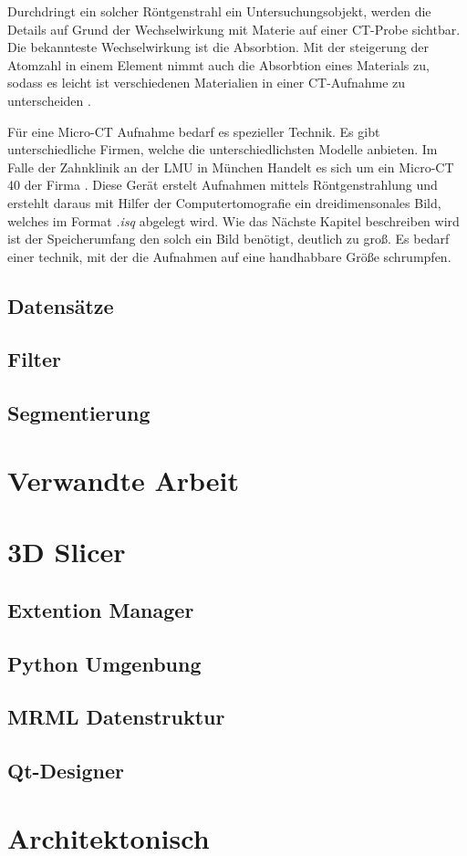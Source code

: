 Durchdringt ein solcher Röntgenstrahl ein Untersuchungsobjekt, werden die Details
auf Grund der Wechselwirkung mit Materie auf einer CT-Probe sichtbar. Die
bekannteste Wechselwirkung ist die Absorbtion. Mit der steigerung der Atomzahl in
einem Element nimmt auch die Absorbtion eines Materials zu, sodass es leicht ist
verschiedenen Materialien in einer CT-Aufnahme zu unterscheiden \citep{nib2024}.

Für eine Micro-CT Aufnahme bedarf es spezieller Technik. Es gibt unterschiedliche Firmen,
welche die unterschiedlichsten Modelle anbieten. Im Falle der Zahnklinik an der LMU in
München Handelt es sich um ein Micro-CT 40 der Firma \citet{scanco2024}. Diese Gerät erstelt
Aufnahmen mittels Röntgenstrahlung und erstehlt daraus mit Hilfer der Computertomografie ein
dreidimensonales Bild, welches im Format \textit{.isq} abgelegt wird. Wie das Nächste Kapitel
beschreiben wird ist der Speicherumfang den solch ein Bild benötigt, deutlich zu groß. Es bedarf
einer technik, mit der die Aufnahmen auf eine handhabbare Größe schrumpfen.


\subsection{Datensätze}

\subsection{Filter}

\subsection{Segmentierung}

\section{Verwandte Arbeit}
\label{sec:verwwandte_arbeit}

\section{3D Slicer}
\label{sec:3d_slicer}

\subsection{Extention Manager}

\subsection{Python Umgenbung}

\subsection{MRML Datenstruktur}

\subsection{Qt-Designer}

\section{Architektonisch}
\label{sec:architektonisch}